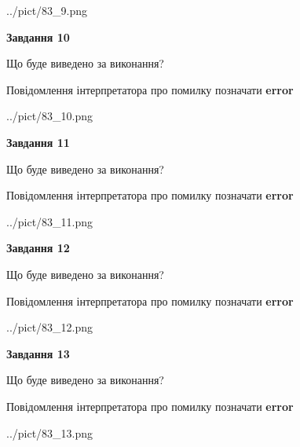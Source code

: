 \documentclass[11pt, ukrainian]{article}
\begin{document}
{\begin {large}
\begin{center}
	{../pict/83_9.png}
\end{center}
\newpage

{\begin {center}\textbf{Завдання 10}\end {center}}\par
Що буде виведено за виконання? \par
Повідомлення інтерпретатора про помилку позначати \textbf{error}

\begin{center}
	{../pict/83_10.png}
\end{center}
\newpage

{\begin {center}\textbf{Завдання 11}\end {center}}\par
Що буде виведено за виконання? \par
Повідомлення інтерпретатора про помилку позначати \textbf{error}

\begin{center}
	{../pict/83_11.png}
\end{center}
\newpage

{\begin {center}\textbf{Завдання 12}\end {center}}\par
Що буде виведено за виконання? \par
Повідомлення інтерпретатора про помилку позначати \textbf{error}

\begin{center}
	{../pict/83_12.png}
\end{center}
\newpage

{\begin {center}\textbf{Завдання 13}\end {center}}\par
Що буде виведено за виконання? \par
Повідомлення інтерпретатора про помилку позначати \textbf{error}

\begin{center}
	{../pict/83_13.png}
\end{center}
\newpage


\end{large}}
\end{document}
